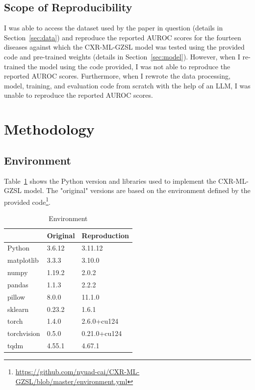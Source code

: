 \documentclass[letterpaper]{article} %
\begin{document}
\subsection{Scope of Reproducibility}

I was able to access the dataset used by the paper in question (details in Section~\ref{sec:data}) and reproduce the reported AUROC scores for the fourteen diseases against which the CXR-ML-GZSL model was tested using the provided code and pre-trained weights (details in Section~\ref{sec:model}). However, when I re-trained the model using the code provided, I was not able to reproduce the reported AUROC scores. Furthermore, when I rewrote the data processing, model, training, and evaluation code from scratch with the help of an LLM, I was unable to reproduce the reported AUROC scores.

\section{Methodology}

\subsection{Environment}

Table~\ref{tab:environment} shows the Python version and libraries used to implement the CXR-ML-GZSL model. The "original" versions are based on the environment defined by the provided code\footnote{\url{https://github.com/nyuad-cai/CXR-ML-GZSL/blob/master/environment.yml}}.

\begin{table}[h!]
\centering
\begin{tabular}{|l|l|l|}
\hline
\textbf{} & \textbf{Original} & \textbf{Reproduction} \\
\hline
Python & 3.6.12 & 3.11.12 \\
matplotlib & 3.3.3 & 3.10.0 \\
numpy & 1.19.2 & 2.0.2 \\
pandas & 1.1.3 & 2.2.2 \\
pillow & 8.0.0 & 11.1.0 \\
sklearn & 0.23.2 & 1.6.1 \\
torch & 1.4.0 & 2.6.0+cu124 \\
torchvision & 0.5.0 & 0.21.0+cu124 \\
tqdm & 4.55.1 & 4.67.1 \\
\hline
\end{tabular}
\caption{Environment}
\label{tab:environment}
\end{table}
\end{document}
